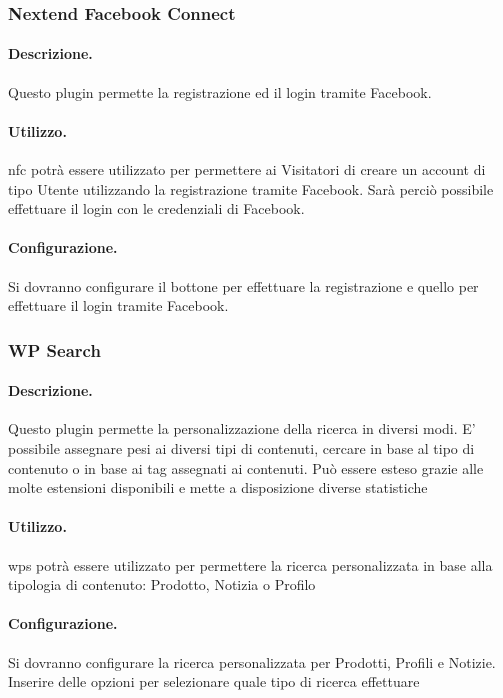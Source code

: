 \subsubsection{Nextend Facebook Connect}
\paragraph{Descrizione.} Questo plugin permette la registrazione ed il login tramite Facebook.
\paragraph{Utilizzo.} \gls{nfc} potrà essere utilizzato per permettere ai Visitatori di creare un account di tipo Utente utilizzando la registrazione tramite Facebook. Sarà perciò possibile effettuare il login con le credenziali di Facebook.
\paragraph{Configurazione.} Si dovranno configurare il bottone per effettuare la registrazione e quello per effettuare il login tramite Facebook.

\subsubsection{WP Search}
\paragraph{Descrizione.} Questo plugin permette la personalizzazione della ricerca in diversi modi. E' possibile assegnare pesi ai diversi tipi di contenuti, cercare in base al tipo di contenuto o in base ai tag assegnati ai contenuti. Può essere esteso grazie alle molte estensioni disponibili e mette a disposizione diverse statistiche
\paragraph{Utilizzo.} \gls{wps} potrà essere utilizzato per permettere la ricerca personalizzata in base alla tipologia di contenuto: Prodotto, Notizia o Profilo
\paragraph{Configurazione.} Si dovranno configurare la ricerca personalizzata per Prodotti, Profili e Notizie. Inserire delle opzioni per selezionare quale tipo di ricerca effettuare

